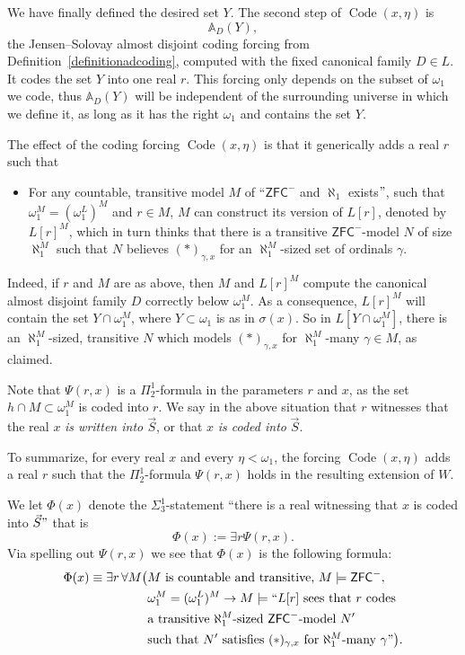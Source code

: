 \documentclass[a4paper,11pt]{article}
\newcommand{\ZFCminus}{\mathsf{ZFC}^{-}}
\begin{document}
We have finally defined the desired set $Y$.  The second step of
$\operatorname{Code}(x,\eta)$ is
\[
   \mathbb A_D(Y),
\]
the Jensen--Solovay almost disjoint coding forcing from
Definition~\ref{definitionadcoding}, computed with the fixed canonical family
$D\in L$.  It codes the set $Y$ into one real $r$.  This forcing only depends
on the subset of $\omega_1$ we code, thus $\mathbb A_D(Y)$ will be independent
of the surrounding universe in which we define it, as long as it has the right
$\omega_1$ and contains the set $Y$.

The effect of the coding forcing $\operatorname{Code}(x,\eta)$ is that it generically adds a real $r$ such that
\begin{itemize}
\item[$ \Psi (r, x)\equiv $] For any countable, transitive model $M$ of ``$\ZFCminus$ and $\aleph_1$ exists$"$, such that $\omega_1^M=(\omega_1^L)^M$ and $ r  \in M$, $M$ can construct its version of $L[r]$, denoted by $L[r]^M$, which in turn thinks that there is a transitive $\ZFCminus$-model $N$ of size $\aleph_1^M$  such that $N$ believes $(\ast)_{\gamma,x}$ for an $\aleph_1^M$-sized set of ordinals $\gamma$.
\end{itemize}

Indeed, if $r$ and $M$ are as above, then $M$ and $L[r]^M$ compute the canonical almost disjoint family $D$ correctly below $\omega_1^M$.  As a consequence, $L[r]^M$ will contain the set $Y \cap \omega_1^M$, where $Y \subset \omega_1$ is as in $\sigma(x)$.  So in $L[Y \cap \omega_1^M]$, there is an $\aleph_1^M$-sized, transitive $N$ which models $(\ast)_{\gamma,x}$ for $\aleph_1^M$-many $\gamma  \in M$, as claimed. 

Note that $\Psi (r,x)$ is a $\Pi^1_2$-formula in the parameters $r$ and $x$, as the set $h \cap M \subset \omega_1^M$ is coded into $r$. We say in the above situation that $r$ witnesses that the real $x$ \emph{ is written into $\vec{S}$}, or that $x$ \emph{is coded into} $\vec{S}$.


To summarize, for every real $x$ and every $\eta<\omega_1$, the forcing $\operatorname{Code}(x,\eta)$ adds a real $r$ such that the $\Pi^1_2$-formula $\Psi(r,x)$ holds in the resulting extension of $W$.

We let $\Phi(x)$ denote the $\Sigma^1_3$-statement ``there is a real witnessing that $x$ is coded into $\vec{S}"$ that is
\[ \Phi(x) := \exists r \Psi (r,x). \] 
Via spelling out $\Psi(r,x)$ we see that $\Phi(x)$ is the following formula:
\begin{align*}
\Phi(x)\equiv \exists r\,\forall M\bigl(&M\text{ is countable and transitive, }M\models\ZFCminus,\\
&\omega_1^M=(\omega_1^L)^M\rightarrow M\models ``L[r]\text{ sees that }r\text{ codes}\\
&\text{a transitive }\aleph_1^M\text{-sized }\ZFCminus\text{-model }N'\\
&\text{such that }N'\text{ satisfies }(\ast)_{\gamma,x}
  \text{ for }\aleph_1^M\text{-many }\gamma"\bigr).
\end{align*}
\end{document}
